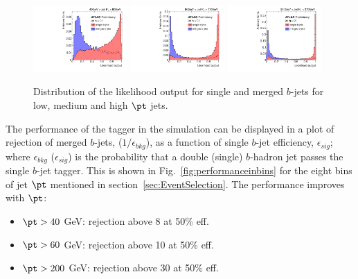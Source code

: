 \begin{figure}[tp]
\centering
\includegraphics[width=0.32\textwidth,viewport=40 0 540 550]{FIGS/Likelihood/NNoutput040_LihoodKDE.pdf}
\includegraphics[width=0.32\textwidth,viewport=40 0 540 550,clip]{FIGS/Likelihood/NNoutput080_LihoodKDE.pdf}
\includegraphics[width=0.32\textwidth,viewport=40 0 540 550,clip]{FIGS/Likelihood/NNoutput200_LihoodKDE.pdf}  
\caption{Distribution of the likelihood output for single and merged $b$-jets for low, medium and high $\pt$ jets.}
\label{fig:outputinbins}
\end{figure}

The performance of the tagger in the simulation can be 
displayed in a plot of rejection of merged $b$-jets, ($1/\epsilon_{bkg}$), as a function of single $b$-jet efficiency, $\epsilon_{sig}$; where $\epsilon_{bkg}$ ($\epsilon_{sig}$) is the probability that a double (single) $b$-hadron jet passes the single $b$-jet tagger. This is shown in Fig.~\ref{fig:performanceinbins} for the eight bins of jet $\pt$ mentioned in section~\ref{sec:EventSelection}. The performance improves with $\pt$:


\begin{itemize}\addtolength{\itemsep}{-0.4\baselineskip}
\item
$\pt>40$ GeV: %
rejection above 8 at 50\% eff.
\item
$\pt>60$ GeV: %
rejection above 10 at 50\% eff.
\item
$\pt>200$ GeV: %
rejection above 30 at 50\% eff.
\end{itemize}



